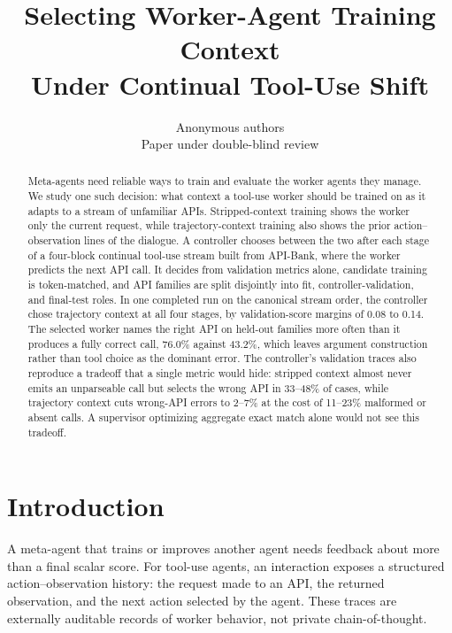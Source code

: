 \documentclass{article}
\title{Selecting Worker-Agent Training Context \\ Under Continual Tool-Use Shift}
\author{Anonymous authors \\ Paper under double-blind review}
\begin{document}
\maketitle

\begin{abstract}
Meta-agents need reliable ways to train and evaluate the worker agents they manage. We study one such decision: what context a tool-use worker should be trained on as it adapts to a stream of unfamiliar APIs. Stripped-context training shows the worker only the current request, while trajectory-context training also shows the prior action--observation lines of the dialogue. A controller chooses between the two after each stage of a four-block continual tool-use stream built from API-Bank, where the worker predicts the next API call. It decides from validation metrics alone, candidate training is token-matched, and API families are split disjointly into fit, controller-validation, and final-test roles. In one completed run on the canonical stream order, the controller chose trajectory context at all four stages, by validation-score margins of 0.08 to 0.14. The selected worker names the right API on held-out families more often than it produces a fully correct call, 76.0\% against 43.2\%, which leaves argument construction rather than tool choice as the dominant error. The controller's validation traces also reproduce a tradeoff that a single metric would hide: stripped context almost never emits an unparseable call but selects the wrong API in 33--48\% of cases, while trajectory context cuts wrong-API errors to 2--7\% at the cost of 11--23\% malformed or absent calls. A supervisor optimizing aggregate exact match alone would not see this tradeoff.
\end{abstract}

\section{Introduction}

A meta-agent that trains or improves another agent needs feedback about more than a final scalar score. For tool-use agents, an interaction exposes a structured action--observation history: the request made to an API, the returned observation, and the next action selected by the agent. These traces are externally auditable records of worker behavior, not private chain-of-thought.
\end{document}
